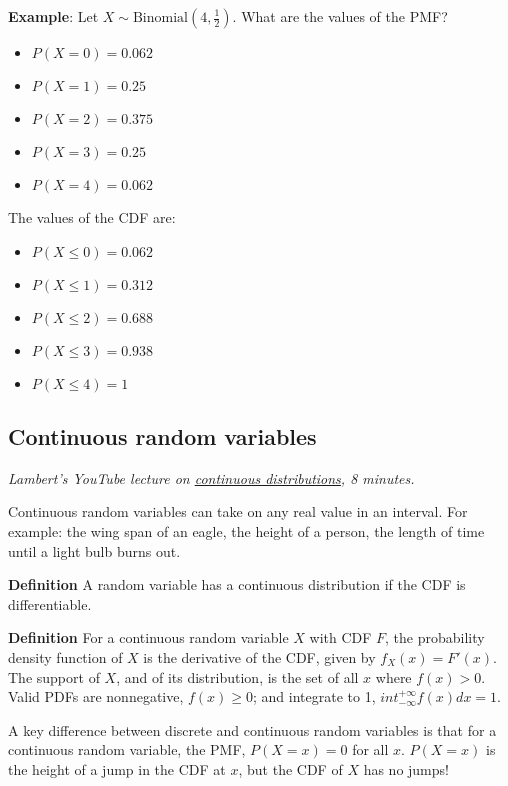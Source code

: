 \documentclass[]{article}
\begin{document}
\vspace{0.1in}
\textbf{Example}: Let $X \sim \textrm{Binomial}(4, \frac{1}{2})$. What are the values of the PMF?

\begin{itemize}
	\item $P(X = 0) = 0.062$ 
	\item $P(X = 1) = 0.25$ 
	\item $P(X = 2) =0.375$ 
	\item $P(X = 3) = 0.25$
	\item $P(X = 4) = 0.062$
\end{itemize}

The values of the CDF are: 
\begin{itemize}
	\item $P(X \leq 0) = 0.062 $
	\item $P(X \leq 1) = 0.312 $
	\item $P(X \leq 2) = 0.688 $
	\item $P(X \leq 3) = 0.938 $
	\item $P(X \leq 4) = 1$
\end{itemize}

\subsection{Continuous random variables}
\emph{Lambert's YouTube lecture on  \href{https://youtu.be/s87mffcX0xU}{continuous distributions}, 8 minutes.}

Continuous random variables can take on any real value in an interval. For example: the wing span of an eagle, the height of a person, the length of time until a light bulb burns out.

\vspace{0.1in}
\textbf{Definition} A random variable has a continuous distribution if the CDF is differentiable.

\vspace{0.1in}
\textbf{Definition} For a continuous random variable $X$ with CDF $F$, the probability density function of $X$ is the derivative of the CDF, given by $f_X(x) = F'(x)$. The support of $X$, and of its distribution, is the set of all $x$ where $f(x) > 0$. Valid PDFs are nonnegative, $f(x) \geq 0$; and integrate to 1, $int_{-\infty}^{+\infty} f(x)dx = 1$.

\vspace{0.1in}
A key difference between discrete and continuous random variables is that for a continuous random variable, the PMF, $P(X=x) = 0$ for all $x$. $P(X = x)$ is the height of a jump in the CDF at $x$, but the CDF of $X$ has no jumps!
\end{document}
